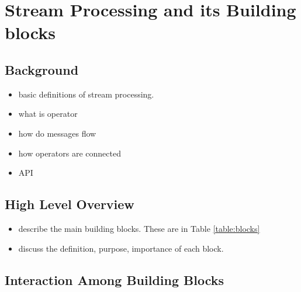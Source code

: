 \section{Stream Processing and its Building blocks}

\subsection{Background}

\begin{itemize}
	\item basic definitions of stream processing. 
	\item what is operator
	\item how do messages flow
	\item how operators are connected
	\item API
\end{itemize}


\subsection{High Level Overview}
\begin{itemize}
	\item describe the main building blocks. These are in Table \ref{table:blocks}
	\item discuss the definition, purpose, importance of each block.	
\end{itemize}


\begin{table}[h]
\end{table}





\subsection{Interaction Among Building Blocks}

